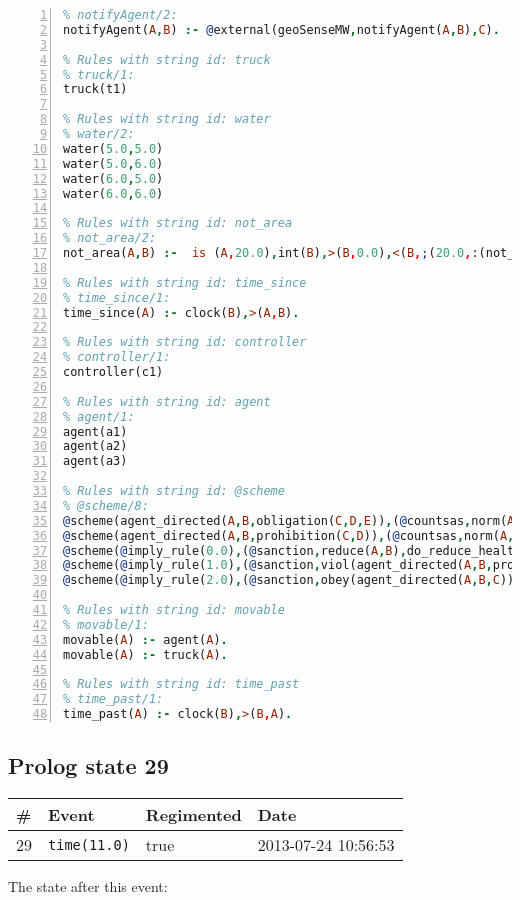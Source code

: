 \documentclass[11pt]{article}\usepackage[utf8]{inputenc}\usepackage{geometry}
\begin{document}
\begin{lstlisting}[language=Prolog, numbers=left]
% Rules with string id: notifyAgent
% notifyAgent/2:
notifyAgent(A,B) :- @external(geoSenseMW,notifyAgent(A,B),C).

% Rules with string id: truck
% truck/1:
truck(t1)

% Rules with string id: water
% water/2:
water(5.0,5.0)
water(5.0,6.0)
water(6.0,5.0)
water(6.0,6.0)

% Rules with string id: not_area
% not_area/2:
not_area(A,B) :-  is (A,20.0),int(B),>(B,0.0),<(B,;(20.0,:(not_area(A,B), is (-(B),20.0)))),int(A),>(A,0.0),<(A,;(20.0,:(area(A,B),-(int(A))))),int(B),>(A,0.0),>(B,0.0),<(A,21.0),<(B,21.0).

% Rules with string id: time_since
% time_since/1:
time_since(A) :- clock(B),>(A,B).

% Rules with string id: controller
% controller/1:
controller(c1)

% Rules with string id: agent
% agent/1:
agent(a1)
agent(a2)
agent(a3)

% Rules with string id: @scheme
% @scheme/8:
@scheme(agent_directed(A,B,obligation(C,D,E)),(@countsas,norm(A,B,F,obligation(C,D,E)),F),false,(listTrue(C)),(time_past(D)),false,[plus(viol(agent_directed(A,B,obligation(C,D,E))))|[]],[plus(obey(agent_directed(A,B,obligation(C,D,E))))|[]])
@scheme(agent_directed(A,B,prohibition(C,D)),(@countsas,norm(A,B,E,prohibition(C,D)),E),(listTrue(C)),false,(false),false,[plus(viol(agent_directed(A,B,prohibition(C,D))))|[]],[plus(obey(agent_directed(A,B,prohibition(C,D))))|[]])
@scheme(@imply_rule(0.0),(@sanction,reduce(A,B),do_reduce_health(A,B),notifyAgent(A,changed(status))),true,false,false,false,[min(reduce(A,B))|[]],[])
@scheme(@imply_rule(1.0),(@sanction,viol(agent_directed(A,B,prohibition(C,D))),do_sanction(D)),true,false,false,false,[min(viol(agent_directed(A,B,prohibition(C,D))))|[]],[])
@scheme(@imply_rule(2.0),(@sanction,obey(agent_directed(A,B,C))),true,false,false,false,[min(obey(agent_directed(A,B,C)))|[]],[])

% Rules with string id: movable
% movable/1:
movable(A) :- agent(A).
movable(A) :- truck(A).

% Rules with string id: time_past
% time_past/1:
time_past(A) :- clock(B),>(B,A).

\end{lstlisting}
\clearpage 
\subsection{Prolog state 29}
\begin{table}[ht]
\centering 
\begin{tabular}{l l l l} 
\textbf{\#} & \textbf{Event} & \textbf{Regimented} & \textbf{Date} \\ [0.5ex] 
\hline
29&\texttt{time(11.0)}&true&2013-07-24 10:56:53\\ [1ex] \hline\end{tabular}
\end{table}
The state after this event:
\end{document}
